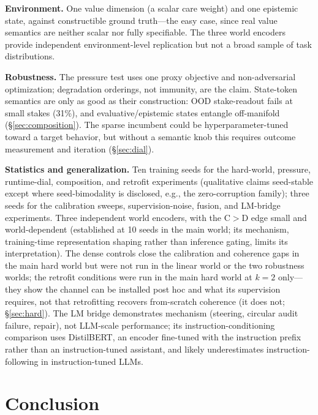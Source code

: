 \documentclass[manuscript, screen, review]{jair}
\begin{document}
\textbf{Environment.} One value dimension (a scalar care weight) and one epistemic state, against constructible ground truth---the easy case, since real value semantics are neither scalar nor fully specifiable. The three world encoders provide independent environment-level replication but not a broad sample of task distributions.

\textbf{Robustness.} The pressure test uses one proxy objective and non-adversarial optimization; degradation orderings, not immunity, are the claim. State-token semantics are only as good as their construction: OOD stake-readout fails at small stakes (31\%), and evaluative/epistemic states entangle off-manifold (\S\ref{sec:composition}). The sparse incumbent could be hyperparameter-tuned toward a target behavior, but without a semantic knob this requires outcome measurement and iteration (\S\ref{sec:dial}).

\textbf{Statistics and generalization.} Ten training seeds for the hard-world, pressure, runtime-dial, composition, and retrofit experiments (qualitative claims seed-stable except where seed-bimodality is disclosed, e.g., the zero-corruption family); three seeds for the calibration sweeps, supervision-noise, fusion, and LM-bridge experiments. Three independent world encoders, with the C$>$D edge small and world-dependent (established at 10 seeds in the main world; its mechanism, training-time representation shaping rather than inference gating, limits its interpretation). The dense controls close the calibration and coherence gaps in the main hard world but were not run in the linear world or the two robustness worlds; the retrofit conditions were run in the main hard world at $k{=}2$ only---they show the channel can be installed post hoc and what its supervision requires, not that retrofitting recovers from-scratch coherence (it does not; \S\ref{sec:hard}). The LM bridge demonstrates mechanism (steering, circular audit failure, repair), not LLM-scale performance; its instruction-conditioning comparison uses DistilBERT, an encoder fine-tuned with the instruction prefix rather than an instruction-tuned assistant, and likely underestimates instruction-following in instruction-tuned LLMs.

\section{Conclusion}
\end{document}

